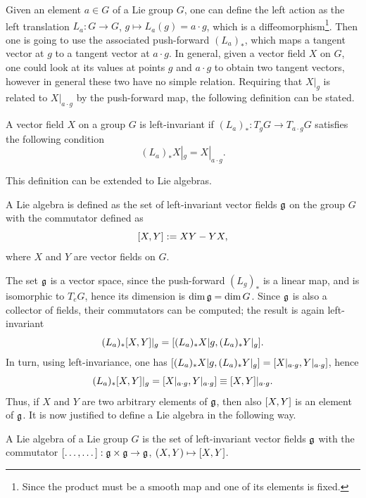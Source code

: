 Given an element $a \in G$ of a Lie group $G$, one can define the left action as the left translation $L_a : G \to G$, $g \mapsto L_a(g) = a\cdot g$, which is a diffeomorphism\footnote{Since the product must be a smooth map and one of its elements is fixed.}. Then one is going to use the associated push-forward $(L_a)_*$, which maps a tangent vector at $g$ to a tangent vector at $a \cdot g$. In general, given a vector field $X$ on $G$, one could look at its values at points $g$ and $a \cdot g$ to obtain two tangent vectors, however in general these two have no simple relation. Requiring that $X|_g$ is related to $X|_{a\cdot g}$ by the push-forward map, the following definition can be stated.
\begin{defn}
    A vector field $X$ on a group $G$ is left-invariant if $(L_a)_* : T_gG \to T_{a\cdot g}G$ satisfies the following condition 
    \begin{equation}
        (L_a)_*X|_g = X|_{a\cdot g}.
    \end{equation}
\end{defn}
This definition can be extended to Lie algebras.
\begin{defn}
    A Lie algebra is defined as the set of left-invariant vector fields $\mathfrak{g}$ on the group $G$ with the commutator defined as 
    \begin{equation}
        [X,Y] := XY - YX,
    \end{equation}
    where $X$ and $Y$ are vector fields on $G$.
\end{defn}
The set $\mathfrak{g}$ is a vector space, since the push-forward $(L_g)_*$ is a linear map, and is isomorphic to $T_eG$, hence its dimension is $\dim{\mathfrak{g}} = \dim{G}$. Since $\mathfrak{g}$ is also a collector of fields, their commutators can be computed; the result is again left-invariant
\begin{equation}
    (L_a)_*[X,Y]|_g = [(L_a)_*X|g,(L_a)_*Y|_g].
\end{equation}
In turn, using left-invariance, one has $[(L_a)_*X|g,(L_a)_*Y|_g] = [X|_{a\cdot g},Y|_{a\cdot g}]$, hence 
\begin{equation}
    (L_a)_*[X,Y]|_g = [X|_{a\cdot g},Y|_{a\cdot g}] \equiv [X,Y]|_{a\cdot g}.
\end{equation}
Thus, if $X$ and $Y$ are two arbitrary elements of $\mathfrak{g}$, then also $[X,Y]$ is an element of $\mathfrak{g}$. It is now justified to define a Lie algebra in the following way.
\begin{defn}
    A Lie algebra of a Lie group $G$ is the set of left-invariant vector fields $\mathfrak{g}$ with the commutator $[\dots,\dots] : \mathfrak{g} \times \mathfrak{g} \to \mathfrak{g}$, $(X,Y) \mapsto [X,Y]$.
\end{defn}
